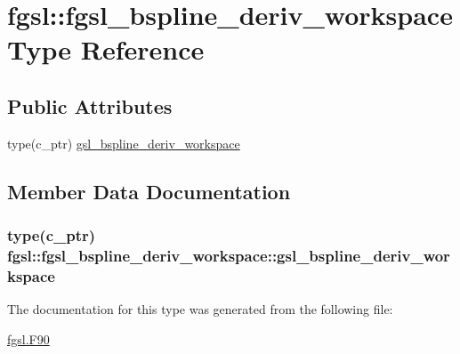 \hypertarget{structfgsl_1_1fgsl__bspline__deriv__workspace}{\section{fgsl\-:\-:fgsl\-\_\-bspline\-\_\-deriv\-\_\-workspace Type Reference}
\label{structfgsl_1_1fgsl__bspline__deriv__workspace}
}
\subsection*{Public Attributes}
\begin{DoxyCompactItemize}
\item 
type(c\-\_\-ptr) \hyperlink{structfgsl_1_1fgsl__bspline__deriv__workspace_a80baca4d0abdb0e69b1b5e93ded72c22}{gsl\-\_\-bspline\-\_\-deriv\-\_\-workspace}
\end{DoxyCompactItemize}


\subsection{Member Data Documentation}
\hypertarget{structfgsl_1_1fgsl__bspline__deriv__workspace_a80baca4d0abdb0e69b1b5e93ded72c22}{
\subsubsection[{gsl\-\_\-bspline\-\_\-deriv\-\_\-workspace}]{\setlength{\rightskip}{0pt plus 5cm}type(c\-\_\-ptr) fgsl\-::fgsl\-\_\-bspline\-\_\-deriv\-\_\-workspace\-::gsl\-\_\-bspline\-\_\-deriv\-\_\-workspace}}\label{structfgsl_1_1fgsl__bspline__deriv__workspace_a80baca4d0abdb0e69b1b5e93ded72c22}


The documentation for this type was generated from the following file\-:\begin{DoxyCompactItemize}
\item 
\hyperlink{fgsl_8F90}{fgsl.\-F90}\end{DoxyCompactItemize}
